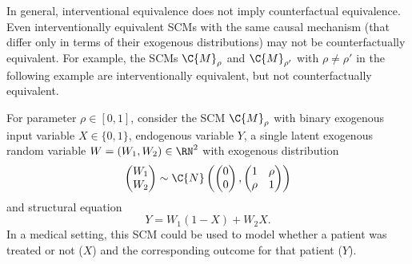 In general, interventional equivalence does not imply counterfactual equivalence. Even interventionally equivalent SCMs with the same causal mechanism (that differ only in terms of their exogenous distributions) may not be counterfactually equivalent. For example, the SCMs $\C{M}_{\rho}$ and $\C{M}_{\rho'}$ with $\rho\neq\rho'$ in the following example are interventionally equivalent, but not counterfactually equivalent.
\begin{Eg}\label{ex:Counterfactuals}
  For parameter $\rho\in[0,1]$, consider the SCM $\C{M}_\rho$ with binary exogenous input variable $X \in \{0,1\}$, endogenous variable $Y$, a single latent exogenous random variable $W = (W_1,W_2) \in \RN^2$ with
exogenous distribution 
  $$\begin{pmatrix} W_1 \\ W_2 \end{pmatrix}\sim\C{N}\left(\begin{pmatrix}0 \\ 0\end{pmatrix},\begin{pmatrix}1&\rho\\ \rho&1\end{pmatrix}\right)$$
and structural equation
  $$Y = W_1 (1 - X) + W_2 X.$$
In a medical setting, this SCM could be used to model whether a patient was treated or not ($X$) and the corresponding outcome for that patient ($Y$).


\end{Eg}
